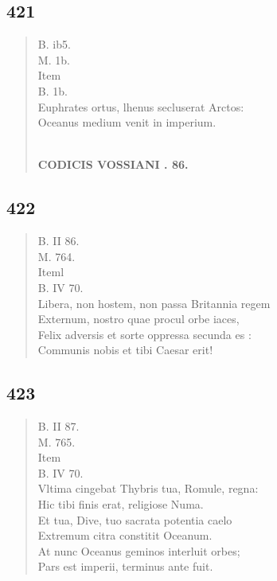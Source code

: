 \documentclass[11pt, a4paper]{report}
\begin{document}
            \subsection*{421}
      \begin{verse}
      B. ib5. \\ M. 1b. \\  \lbrack Item \rbrack  \\ B. 1b. \\ Euphrates ortus, lhenus secluserat Arctos: \\ Oceanus medium venit in imperium. \\ 
        ﻿\pagebreak 
    \begin{center} \textbf{CODICIS VOSSIANI . 86.} \end{center} \marginpar{[325]} 
      \end{verse}
  
            \subsection*{422}
      \begin{verse}
      B. II 86. \\ M. 764. \\  \lbrack Iteml \\ B. IV 70. \\ Libera, non hostem, non passa Britannia regem \\ Externum, nostro quae procul orbe iaces, \\ Felix adversis et sorte oppressa secunda  \lbrack es \rbrack : \\ Communis nobis et tibi Caesar erit! \\ 
      \end{verse}
  
            \subsection*{423}
      \begin{verse}
      B. II 87. \\ M. 765. \\  \lbrack Item \rbrack  \\ B. IV 70. \\ Vltima cingebat Thybris tua, Romule, regna: \\ Hic tibi finis erat, religiose Numa. \\ Et tua, Dive, tuo sacrata potentia caelo \\ Extremum citra constitit Oceanum. \\ At nunc Oceanus geminos interluit orbes; \\ Pars est imperii, terminus ante fuit. \\ 
      \end{verse}
  
\end{document}
